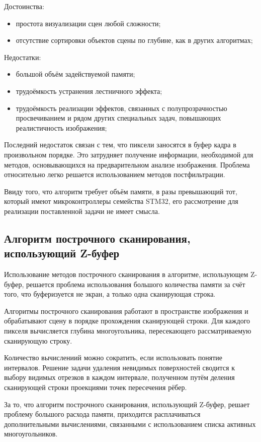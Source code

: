 Достоинства:
\begin{itemize}
	\item простота визуализации сцен любой сложности;
	\item отсутствие сортировки объектов сцены по глубине, как в других алгоритмах;
\end{itemize}

Недостатки:
\begin{itemize}
	\item большой объём задействуемой памяти;
	\item трудоёмкость устранения лестничного эффекта;
	\item трудоёмкость реализации эффектов, связанных с полупрозрачностью просвечиванием и рядом других специальных задач, повышающих реалистичность изображения;
\end{itemize}

Последний недостаток связан с тем, что пиксели заносятся в буфер кадра в произвольном порядке. Это затрудняет получение информации, необходимой для методов, основывающихся на предварительном анализе изображения. Проблема относительно легко решается использованием методов постфильтрации.

Ввиду того, что алгоритм требует объём памяти, в разы превышающий тот, который имеют микроконтроллеры семейства STM32, его рассмотрение для реализации поставленной задачи не имеет смысла.

\subsection{Алгоритм построчного сканирования, использующий Z-буфер}
Использование методов построчного сканирования в алгоритме, использующем Z-буфер, решается проблема использования большого количества памяти за счёт того, что буферизуется не экран, а только одна сканирующая строка.

Алгоритмы построчного сканирования работают в пространстве изображения и обрабатывают сцену в порядке прохождения сканирующей строки. Для каждого пикселя вычисляется глубина многоугольника, пересекающего рассматриваемую сканирующую строку. 

Количество вычислениий можно сократить, если использовать понятие интервалов. Решение задачи удаления невидимых поверхностей сводится к выбору видимых отрезков в каждом интервале, полученном путём деления сканирующей строки проекциями точек пересечения рёбер.

За то, что алгоритм построчного сканирования, использующий Z-буфер, решает проблему большого расхода памяти, приходится расплачиваться дополнительными вычислениями, связанными с использованием списка активных многоугольников.

